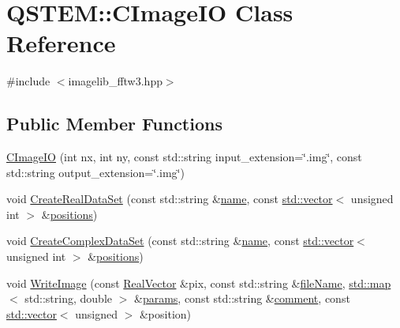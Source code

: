 \hypertarget{class_q_s_t_e_m_1_1_c_image_i_o}{\section{Q\-S\-T\-E\-M\-:\-:C\-Image\-I\-O Class Reference}
\label{class_q_s_t_e_m_1_1_c_image_i_o}
}


{\ttfamily \#include $<$imagelib\-\_\-fftw3.\-hpp$>$}

\subsection*{Public Member Functions}
\begin{DoxyCompactItemize}
\item 
\hyperlink{class_q_s_t_e_m_1_1_c_image_i_o_ae42efef91128103c9255ba464c5c8457}{C\-Image\-I\-O} (int nx, int ny, const std\-::string input\-\_\-extension=\char`\"{}.img\char`\"{}, const std\-::string output\-\_\-extension=\char`\"{}.img\char`\"{})
\item 
void \hyperlink{class_q_s_t_e_m_1_1_c_image_i_o_a55315d90b3cf53f9a45bd414d547fecb}{Create\-Real\-Data\-Set} (const std\-::string \&\hyperlink{qmb_8m_abdc1dcc6fed70c14f9b5ae237e486f4e}{name}, const \hyperlink{qmb_8m_af54b69a32590de218622e869b06b47b3}{std\-::vector}$<$ unsigned int $>$ \&\hyperlink{qmb_8m_a923d61728dac7c6dff07427a901c9ba9}{positions})
\item 
void \hyperlink{class_q_s_t_e_m_1_1_c_image_i_o_a1014b8c47e8c19fa453bb7438b070189}{Create\-Complex\-Data\-Set} (const std\-::string \&\hyperlink{qmb_8m_abdc1dcc6fed70c14f9b5ae237e486f4e}{name}, const \hyperlink{qmb_8m_af54b69a32590de218622e869b06b47b3}{std\-::vector}$<$ unsigned int $>$ \&\hyperlink{qmb_8m_a923d61728dac7c6dff07427a901c9ba9}{positions})
\item 
void \hyperlink{class_q_s_t_e_m_1_1_c_image_i_o_aa62432068099bcaf3c06ad074e11038c}{Write\-Image} (const \hyperlink{namespace_q_s_t_e_m_a8dfe9e1dbecce3838cb082d96e991ba7}{Real\-Vector} \&pix, const std\-::string \&\hyperlink{qmb_8m_a7a230f02bdffebd1357e3c0b49e01271}{file\-Name}, \hyperlink{_displacement_params_8m_af619c74fd72bdb64d115463dff2720cd}{std\-::map}$<$ std\-::string, double $>$ \&\hyperlink{image_sim_8m_ad57b218fb254a1624c09ad71cb6b6415}{params}, const std\-::string \&\hyperlink{image_sim_8m_aea4cc4bd8e43a7f8ebf9b0ee3da8d681}{comment}, const \hyperlink{qmb_8m_af54b69a32590de218622e869b06b47b3}{std\-::vector}$<$ unsigned $>$ \&position)
\item 

\end{DoxyCompactItemize}
